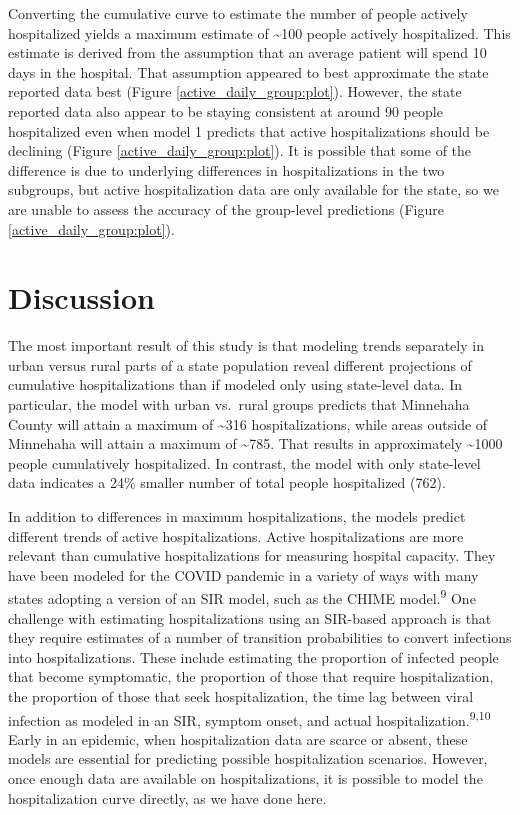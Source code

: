 \documentclass[
]{article}
\begin{document}
Converting the cumulative curve to estimate the number of people actively hospitalized yields a maximum estimate of \textasciitilde100 people actively hospitalized. This estimate is derived from the assumption that an average patient will spend 10 days in the hospital. That assumption appeared to best approximate the state reported data best (Figure \ref{active_daily_group:plot}). However, the state reported data also appear to be staying consistent at around 90 people hospitalized even when model 1 predicts that active hospitalizations should be declining (Figure \ref{active_daily_group:plot}). It is possible that some of the difference is due to underlying differences in hospitalizations in the two subgroups, but active hospitalization data are only available for the state, so we are unable to assess the accuracy of the group-level predictions (Figure \ref{active_daily_group:plot}).

\hypertarget{discussion}{%
\section{Discussion}\label{discussion}}

The most important result of this study is that modeling trends separately in urban versus rural parts of a state population reveal different projections of cumulative hospitalizations than if modeled only using state-level data. In particular, the model with urban vs.~rural groups predicts that Minnehaha County will attain a maximum of \textasciitilde316 hospitalizations, while areas outside of Minnehaha will attain a maximum of \textasciitilde785. That results in approximately \textasciitilde1000 people cumulatively hospitalized. In contrast, the model with only state-level data indicates a 24\% smaller number of total people hospitalized (762).

In addition to differences in maximum hospitalizations, the models predict different trends of active hospitalizations. Active hospitalizations are more relevant than cumulative hospitalizations for measuring hospital capacity. They have been modeled for the COVID pandemic in a variety of ways with many states adopting a version of an SIR model, such as the CHIME model.\textsuperscript{9} One challenge with estimating hospitalizations using an SIR-based approach is that they require estimates of a number of transition probabilities to convert infections into hospitalizations. These include estimating the proportion of infected people that become symptomatic, the proportion of those that require hospitalization, the proportion of those that seek hospitalization, the time lag between viral infection as modeled in an SIR, symptom onset, and actual hospitalization.\textsuperscript{9,10} Early in an epidemic, when hospitalization data are scarce or absent, these models are essential for predicting possible hospitalization scenarios. However, once enough data are available on hospitalizations, it is possible to model the hospitalization curve directly, as we have done here.
\end{document}
